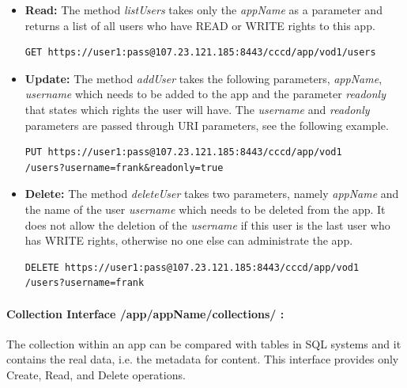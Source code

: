 \begin{itemize}
\item \textbf{Read:} The method \textit{listUsers} takes only the \textit{appName} as a parameter and returns a list of all users who have READ or WRITE rights to this app.

\begin{code}
\begin{verbatim}
GET https://user1:pass@107.23.121.185:8443/cccd/app/vod1/users
\end{verbatim}
\end{code}

\item \textbf{Update:} The method \textit{addUser} takes the following parameters, \textit{appName}, \textit{username} which needs to be added to the app and the parameter \textit{readonly} that states which rights the user will have. The \textit{username} and \textit{readonly} parameters are passed through \ac{URI} parameters, see the following example.

\begin{code}
\begin{verbatim}
PUT https://user1:pass@107.23.121.185:8443/cccd/app/vod1
/users?username=frank&readonly=true
\end{verbatim}
\end{code}

\item \textbf{Delete:} The method \textit{deleteUser} takes two parameters, namely \textit{appName} and the name of the user \textit{username} which needs to be deleted from the app. It does not allow the deletion of the \textit{username} if this user is the last user who has WRITE rights, otherwise no one else can administrate the app.

\begin{code}
\begin{verbatim}
DELETE https://user1:pass@107.23.121.185:8443/cccd/app/vod1
/users?username=frank
\end{verbatim}
\end{code}

\end{itemize}

\paragraph{Collection Interface /app/{appName}/collections/ :} The collection within an app can be compared with tables in SQL systems and it contains the real data, i.e. the metadata for content. This interface provides only Create, Read, and Delete operations. 

